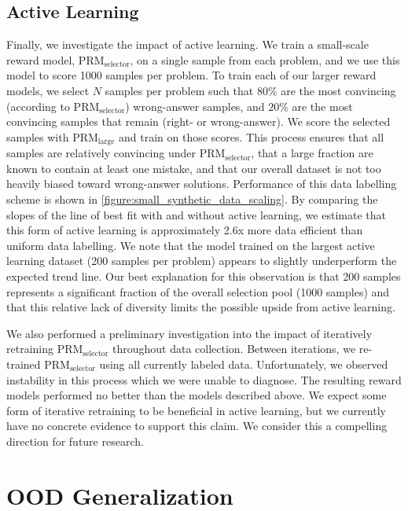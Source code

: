 \subsection{Active Learning} \label{section:active_learning}

Finally, we investigate the impact of active learning. We train a small-scale reward model, $\text{PRM}_{\text{selector}}$, on a single sample from each problem, and we use this model to score 1000 samples per problem. To train each of our larger reward models, we select $N$ samples per problem such that $80\%$ are the most convincing (according to $\text{PRM}_{\text{selector}}$) wrong-answer samples, and $20\%$ are the most convincing samples that remain (right- or wrong-answer). We score the selected samples with $\text{PRM}_{\text{large}}$ and train on those scores. This process ensures that all samples are relatively convincing under $\text{PRM}_{\text{selector}}$, that a large fraction are known to contain at least one mistake, and that our overall dataset is not too heavily biased toward wrong-answer solutions. Performance of this data labelling scheme is shown in \ref{figure:small_synthetic_data_scaling}. By comparing the slopes of the line of best fit with and without active learning, we estimate that this form of active learning is approximately 2.6x more data efficient than uniform data labelling. We note that the model trained on the largest active learning dataset (200 samples per problem) appears to slightly underperform the expected trend line. Our best explanation for this observation is that 200 samples represents a significant fraction of the overall selection pool (1000 samples) and that this relative lack of diversity limits the possible upside from active learning.

We also performed a preliminary investigation into the impact of iteratively retraining $\text{PRM}_{\text{selector}}$ throughout data collection. Between iterations, we re-trained $\text{PRM}_{\text{selector}}$ using all currently labeled data. Unfortunately, we observed instability in this process which we were unable to diagnose. The resulting reward models performed no better than the models described above. We expect some form of iterative retraining to be beneficial in active learning, but we currently have no concrete evidence to support this claim. We consider this a compelling direction for future research.

\section{OOD Generalization} \label{section:generalization}

